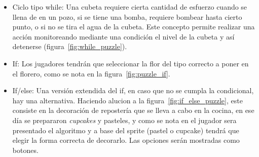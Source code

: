 \begin{itemize}
    \item Ciclo tipo while: Una cubeta requiere cierta cantidad de esfuerzo cuando se llena de en un pozo, si se tiene una bomba, requiere bombear hasta cierto punto, o si no se tira el agua de la cubeta. Este concepto permite realizar una acción monitoreando mediante una condición el nivel de la cubeta y así detenerse (figura~\ref{fig:while_puzzle}).
    \item If: Los jugadores tendrán que seleccionar la flor del tipo correcto a poner en el florero, como se nota en la figura~\ref{fig:puzzle_if}.
    \item If/else: Una versión extendida del if, en caso que no se cumpla la condicional, hay una alternativa. Haciendo alucion a la figura~\ref{fig:if_else_puzzle}, este consiste en la decoración de repostería que se lleva a cabo en la cocina, en ese día se prepararon \textit{cupcakes} y pasteles, y como se nota en el jugador sera presentado el algoritmo y a base del sprite (pastel o cupcake) tendrá que elegir la forma correcta de decorarlo. Las opciones serán mostradas como botones.
\end{itemize}

